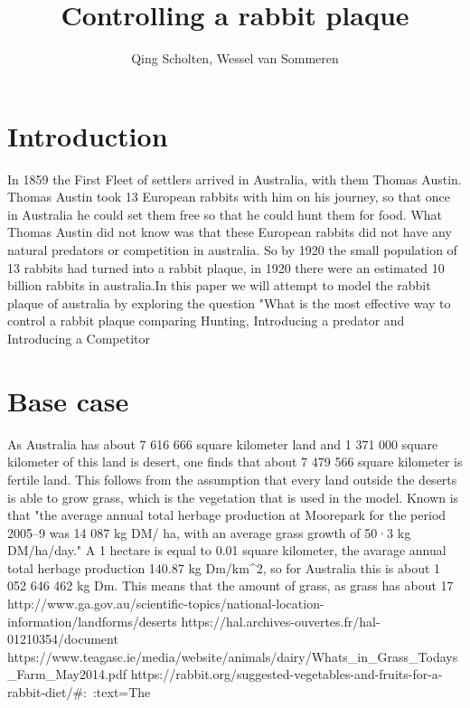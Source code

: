 \documentclass{article}
\author{Qing Scholten, Wessel van Sommeren}
\title{Controlling a rabbit plaque}
\begin{document}
\maketitle
\newpage
\tableofcontents
\newpage

\section{Introduction}
In 1859 the First Fleet of settlers arrived in Australia, with them Thomas Austin. Thomas Austin took 13 European rabbits with him on his journey, so that once in Australia he could set them free so that he could hunt them for food. What Thomas Austin did not know was that these European rabbits did not have any natural predators or competition in australia. So by 1920 the small population of 13 rabbits had turned into a rabbit plaque, in 1920 there were an estimated 10 billion rabbits in australia.In this paper we will attempt to model the rabbit plaque of australia by exploring the question "What is the most effective way to control a rabbit plaque comparing Hunting, Introducing a predator and Introducing a Competitor 



\section{Base case}
As Australia has about 7 616 666 square kilometer land and 1 371 000 square kilometer of this land is desert, one finds that about 7 479 566 square kilometer is fertile land. This follows from the assumption that every land outside the deserts is able to grow grass, which is the vegetation that is used in the model. Known is that "the average annual total herbage production at Moorepark for the period 2005–9 was 14 087 kg DM/ ha, with an average grass growth of 50·3 kg DM/ha/day." A 1 hectare is equal to 0.01 square kilometer, the avarage annual total herbage production 140.87 kg Dm/km^2, so for Australia this is about 1 052 646 462 kg Dm. This means that the amount of grass, as grass has about 17%
http://www.ga.gov.au/scientific-topics/national-location-information/landforms/deserts
https://hal.archives-ouvertes.fr/hal-01210354/document
https://www.teagasc.ie/media/website/animals/dairy/Whats_in_Grass_Todays_Farm_May2014.pdf
https://rabbit.org/suggested-vegetables-and-fruits-for-a-rabbit-diet/#:~:text=The%
\end{document}

